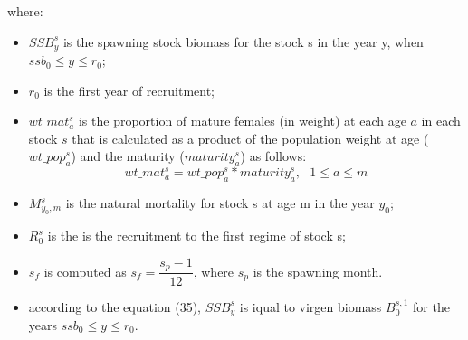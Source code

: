 \documentclass{article}
\begin{document}
where:

\begin{itemize}
  
   \item $SSB^s_y$ is the spawning stock biomass for the stock s in the year y, when  $ssb_0\leq y \leq r_0$;
   
   \item $r_0$ is the first year of recruitment;
   
   \item $wt\_{mat}^s_a$ is the proportion of mature females (in weight) at each age $a$ in each stock $s$ that is calculated as a product of the population weight at age ($wt\_pop^s_a$) and the maturity ($maturity^s_a$) as follows:
    \begin{equation}
        wt\_{mat}^s_a=wt\_pop^s_a *maturity^s_a, \ \ \ 1\leq a \leq m 
    \end{equation}
        
    \item $M^s_{y_0,m}$ is the natural mortality for stock s at age m in the year $y_0$;
    
    \item $R^s_{0}$ is the is the recruitment to the first regime of stock s;

    \item $s_f$ is computed as $s_f=\dfrac{s_p-1}{12}$, where $s_p$ is the spawning month.
    \item according to the equation (35), $SSB^s_y$ is iqual to virgen biomass $B^{s,1}_0$ for the years $ssb_0\leq y \leq r_0$.
\end{itemize}
\end{document}

